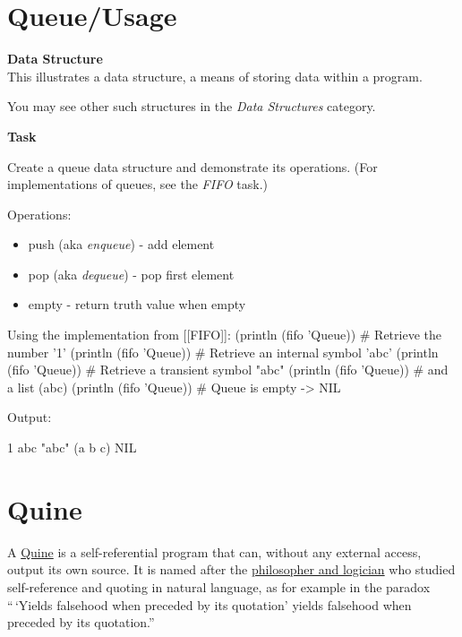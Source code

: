 \pagebreak{}
\section*{Queue/Usage}


\textbf{Data Structure}\\ This illustrates a data structure, a means of
storing data within a program.

You may see other such structures in the \emph{Data Structures}
category.


\textbf{Task}

Create a queue data structure and demonstrate its operations. (For
implementations of queues, see the \emph{FIFO} task.)

Operations:

\begin{itemize}
\item
  push (aka \emph{enqueue}) - add element
\item
  pop (aka \emph{dequeue}) - pop first element
\item
  empty - return truth value when empty
\end{itemize}


\begin{wideverbatim}

Using the implementation from [[FIFO]]:
(println (fifo 'Queue))    # Retrieve the number '1'
(println (fifo 'Queue))    # Retrieve an internal symbol 'abc'
(println (fifo 'Queue))    # Retrieve a transient symbol "abc"
(println (fifo 'Queue))    # and a list (abc)
(println (fifo 'Queue))    # Queue is empty -> NIL

Output:

1
abc
"abc"
(a b c)
NIL

\end{wideverbatim}

\pagebreak{}
\section*{Quine}


A \href{http://en.wikipedia.org/wiki/Quine\_(computing)}{Quine} is a
self-referential program that can, without any external access, output
its own source. It is named after the
\href{http://en.wikipedia.org/wiki/Willard\_Van\_Orman\_Quine}{philosopher
and logician} who studied self-reference and quoting in natural
language, as for example in the paradox ``\,`Yields falsehood when
preceded by its quotation' yields falsehood when preceded by its
quotation.''

